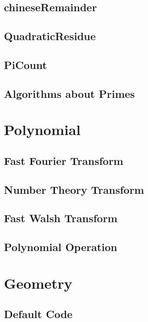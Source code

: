 \subsection{chineseRemainder}

\subsection{QuadraticResidue}

\subsection{PiCount}

\subsection{Algorithms about Primes}



\section{Polynomial}
\subsection{Fast Fourier Transform}

\subsection{Number Theory Transform}

\subsection{Fast Walsh Transform}

\subsection{Polynomial Operation}



\section{Geometry}
\subsection{Default Code}

